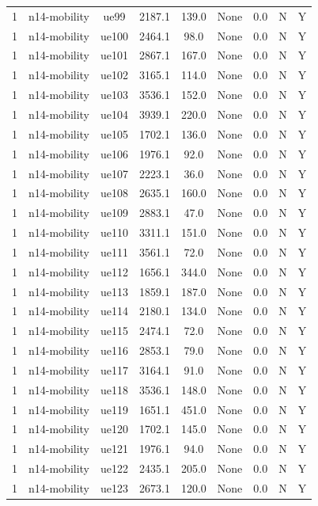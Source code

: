 \begin{table}[ht]
\begin{tabular}{|c|c|c|c|c|c|c|c|c|}
1 & n14-mobility & ue99 & 2187.1 & 139.0 & None & 0.0 & N & Y \\
1 & n14-mobility & ue100 & 2464.1 & 98.0 & None & 0.0 & N & Y \\
1 & n14-mobility & ue101 & 2867.1 & 167.0 & None & 0.0 & N & Y \\
1 & n14-mobility & ue102 & 3165.1 & 114.0 & None & 0.0 & N & Y \\
1 & n14-mobility & ue103 & 3536.1 & 152.0 & None & 0.0 & N & Y \\
1 & n14-mobility & ue104 & 3939.1 & 220.0 & None & 0.0 & N & Y \\
1 & n14-mobility & ue105 & 1702.1 & 136.0 & None & 0.0 & N & Y \\
1 & n14-mobility & ue106 & 1976.1 & 92.0 & None & 0.0 & N & Y \\
1 & n14-mobility & ue107 & 2223.1 & 36.0 & None & 0.0 & N & Y \\
1 & n14-mobility & ue108 & 2635.1 & 160.0 & None & 0.0 & N & Y \\
1 & n14-mobility & ue109 & 2883.1 & 47.0 & None & 0.0 & N & Y \\
1 & n14-mobility & ue110 & 3311.1 & 151.0 & None & 0.0 & N & Y \\
1 & n14-mobility & ue111 & 3561.1 & 72.0 & None & 0.0 & N & Y \\
1 & n14-mobility & ue112 & 1656.1 & 344.0 & None & 0.0 & N & Y \\
1 & n14-mobility & ue113 & 1859.1 & 187.0 & None & 0.0 & N & Y \\
1 & n14-mobility & ue114 & 2180.1 & 134.0 & None & 0.0 & N & Y \\
1 & n14-mobility & ue115 & 2474.1 & 72.0 & None & 0.0 & N & Y \\
1 & n14-mobility & ue116 & 2853.1 & 79.0 & None & 0.0 & N & Y \\
1 & n14-mobility & ue117 & 3164.1 & 91.0 & None & 0.0 & N & Y \\
1 & n14-mobility & ue118 & 3536.1 & 148.0 & None & 0.0 & N & Y \\
1 & n14-mobility & ue119 & 1651.1 & 451.0 & None & 0.0 & N & Y \\
1 & n14-mobility & ue120 & 1702.1 & 145.0 & None & 0.0 & N & Y \\
1 & n14-mobility & ue121 & 1976.1 & 94.0 & None & 0.0 & N & Y \\
1 & n14-mobility & ue122 & 2435.1 & 205.0 & None & 0.0 & N & Y \\
1 & n14-mobility & ue123 & 2673.1 & 120.0 & None & 0.0 & N & Y \\

\end{tabular}
\end{table}
